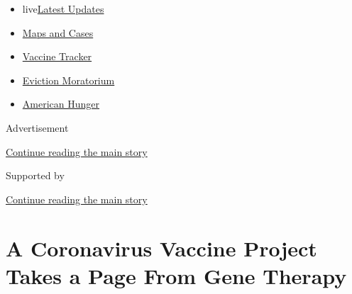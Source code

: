 \begin{itemize}
\tightlist
\item
  live\href{https://www.nytimes3xbfgragh.onion/2020/09/05/world/coronavirus-covid.html?name=styln-coronavirus-national\&region=TOP_BANNER\&block=storyline_menu_recirc\&action=click\&pgtype=Article\&impression_id=075c0c90-efba-11ea-9ddb-53a6a90d6799\&variant=undefined}{Latest
  Updates}
\item
  \href{https://www.nytimes3xbfgragh.onion/interactive/2020/us/coronavirus-us-cases.html?name=styln-coronavirus-national\&region=TOP_BANNER\&block=storyline_menu_recirc\&action=click\&pgtype=Article\&impression_id=075c0c91-efba-11ea-9ddb-53a6a90d6799\&variant=undefined}{Maps
  and Cases}
\item
  \href{https://www.nytimes3xbfgragh.onion/interactive/2020/science/coronavirus-vaccine-tracker.html?name=styln-coronavirus-national\&region=TOP_BANNER\&block=storyline_menu_recirc\&action=click\&pgtype=Article\&impression_id=075c0c92-efba-11ea-9ddb-53a6a90d6799\&variant=undefined}{Vaccine
  Tracker}
\item
  \href{https://www.nytimes3xbfgragh.onion/2020/09/02/your-money/eviction-moratorium-covid.html?name=styln-coronavirus-national\&region=TOP_BANNER\&block=storyline_menu_recirc\&action=click\&pgtype=Article\&impression_id=075c0c93-efba-11ea-9ddb-53a6a90d6799\&variant=undefined}{Eviction
  Moratorium}
\item
  \href{https://www.nytimes3xbfgragh.onion/interactive/2020/09/02/magazine/food-insecurity-hunger-us.html?name=styln-coronavirus-national\&region=TOP_BANNER\&block=storyline_menu_recirc\&action=click\&pgtype=Article\&impression_id=075c0c94-efba-11ea-9ddb-53a6a90d6799\&variant=undefined}{American
  Hunger}
\end{itemize}

Advertisement

\protect\hyperlink{after-top}{Continue reading the main story}

Supported by

\protect\hyperlink{after-sponsor}{Continue reading the main story}

\hypertarget{a-coronavirus-vaccine-project-takes-a-page-from-gene-therapy}{%
\section{A Coronavirus Vaccine Project Takes a Page From Gene
Therapy}\label{a-coronavirus-vaccine-project-takes-a-page-from-gene-therapy}}

